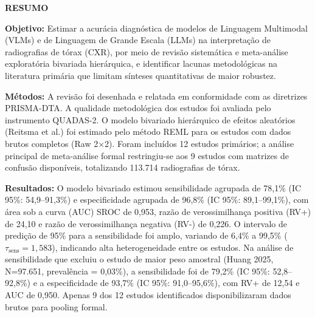 \documentclass[12pt,a4paper]{article}
\begin{document}
\onehalfspacing

\newpage
\begin{center}
    {\large \textbf{RESUMO}}
\end{center}
\vspace{0.5cm}
\begin{singlespace}
\noindent \textbf{Objetivo:} Estimar a acurácia diagnóstica de modelos de Linguagem Multimodal (VLMs) e de Linguagem de Grande Escala (LLMs) na interpretação de radiografias de tórax (CXR), por meio de revisão sistemática e meta-análise exploratória bivariada hierárquica, e identificar lacunas metodológicas na literatura primária que limitam sínteses quantitativas de maior robustez.

\noindent \textbf{Métodos:} A revisão foi desenhada e relatada em conformidade com as diretrizes PRISMA-DTA. A qualidade metodológica dos estudos foi avaliada pelo instrumento QUADAS-2. O modelo bivariado hierárquico de efeitos aleatórios (Reitsma et al.) foi estimado pelo método REML para os estudos com dados brutos completos (Raw 2$\times$2). Foram incluídos 12 estudos primários; a análise principal de meta-análise formal restringiu-se aos 9 estudos com matrizes de confusão disponíveis, totalizando 113.714 radiografias de tórax.

\noindent \textbf{Resultados:} O modelo bivariado estimou sensibilidade agrupada de 78,1\% (IC 95\%: 54,9--91,3\%) e especificidade agrupada de 96,8\% (IC 95\%: 89,1--99,1\%), com área sob a curva (AUC) SROC de 0,953, razão de verossimilhança positiva (RV+) de 24,10 e razão de verossimilhança negativa (RV-) de 0,226. O intervalo de predição de 95\% para a sensibilidade foi amplo, variando de 6,4\% a 99,5\% ($\tau_{\text{sens}}=1,583$), indicando alta heterogeneidade entre os estudos. Na análise de sensibilidade que excluiu o estudo de maior peso amostral (Huang 2025, N=97.651, prevalência = 0,03\%), a sensibilidade foi de 79,2\% (IC 95\%: 52,8--92,8\%) e a especificidade de 93,7\% (IC 95\%: 91,0--95,6\%), com RV+ de 12,54 e AUC de 0,950. Apenas 9 dos 12 estudos identificados disponibilizaram dados brutos para pooling formal.


\end{singlespace}
\end{document}

